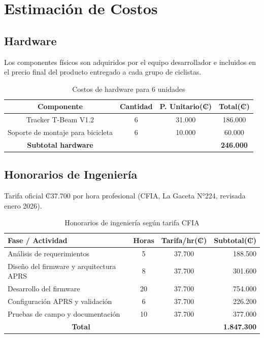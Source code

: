 \documentclass[conference]{IEEEtran}
\begin{document}
\section{Estimación de Costos}

\subsection{Hardware}

Los componentes físicos son adquiridos por el equipo desarrollador e incluidos en el precio final del producto entregado a cada grupo de ciclistas.

\begin{table}[H]
    \centering
    \scriptsize
    \caption{Costos de hardware para 6 unidades}
    \begin{tabular}{|c|c|c|c|}
        \hline
        \textbf{Componente} & \textbf{Cantidad} & \textbf{P. Unitario(₡)} & \textbf{Total(₡)} \\
        \hline
        Tracker T-Beam V1.2 & 6 & 31.000 & 186.000 \\
        Soporte de montaje para bicicleta & 6 & 10.000 & 60.000 \\
        \hline
        \textbf{Subtotal hardware} & & & \textbf{246.000} \\
        \hline
    \end{tabular}
    \label{tab:costo_hardware}
\end{table}

\subsection{Honorarios de Ingeniería}

Tarifa oficial ₡37.700 por hora profesional (CFIA, La Gaceta N°224, revisada enero 2026).

\begin{table}[H]
    \centering
    \scriptsize
    \caption{Honorarios de ingeniería según tarifa CFIA}
    \begin{tabular}{|l|c|c|r|}
        \hline
        \textbf{Fase / Actividad} & \textbf{Horas} & \textbf{Tarifa/hr(₡)} & \textbf{Subtotal(₡)} \\
        \hline
        Análisis de requerimientos & 5 & 37.700 & 188.500 \\
        Diseño del firmware y arquitectura APRS & 8 & 37.700 & 301.600 \\
        Desarrollo del firmware & 20 & 37.700 & 754.000 \\
        Configuración APRS y validación & 6 & 37.700 & 226.200 \\
        Pruebas de campo y documentación & 10 & 37.700 & 377.000 \\
        \hline
        \multicolumn{2}{|c|}{\textbf{Total}} & & \textbf{1.847.300} \\
        \hline
    \end{tabular}
    \label{tab:honorarios}
\end{table}
\end{document}
